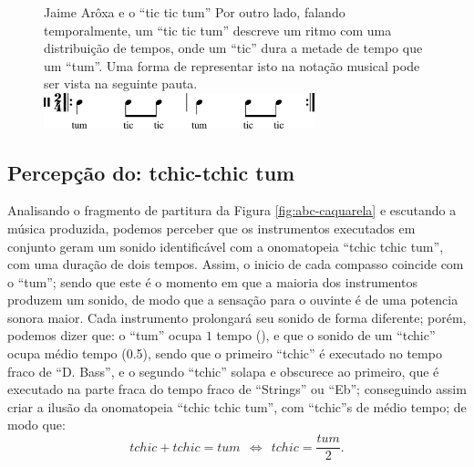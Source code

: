 \begin{figure}[hb!]
\begin{elaboracion}{Jaime Arôxa e o ``tic tic tum''}
Por outro lado, falando temporalmente, um ``tic tic tum'' descreve um ritmo com uma distribuição de tempos, 
onde um ``tic'' dura a metade de tempo que um ``tum''. 
Uma forma de representar isto na notação musical pode ser vista na seguinte pauta.\\

\centering
\href{https://drive.google.com/file/d/1CZaAP5lPzVX7oTT5EMpIKN-XbOUYUt3Y/view?usp=sharing}{\includegraphics[width=0.7\textwidth]{chapters/cap-musicalidade-percepcion/abc-tictictumaroxa-1.eps}}

\end{elaboracion}
\end{figure}


\subsection{Percepção do: tchic-tchic tum}

Analisando o fragmento de partitura da Figura \ref{fig:abc-caquarela} e escutando a música produzida, 
podemos perceber que os instrumentos executados em conjunto geram um sonido identificável
com a onomatopeia ``tchic tchic tum'', com uma duração de dois tempos.
Assim, o inicio de cada compasso coincide com o ``tum''; 
sendo que este é o momento em que a maioria dos instrumentos produzem um sonido, 
de modo que a sensação para o ouvinte é de uma potencia sonora maior. 
Cada instrumento prolongará seu sonido de forma diferente; 
porém,  podemos dizer que: o ``tum'' ocupa $1$ tempo (\quarternote), 
e que o sonido de um ``tchic'' ocupa médio tempo (0.5\quarternote),
sendo que o primeiro ``tchic'' é executado no tempo fraco de ``D. Bass'', 
e o segundo ``tchic'' solapa e obscurece ao  primeiro, 
que é executado na parte fraca do tempo fraco de ``Strings'' ou ``Eb'';
conseguindo assim criar a ilusão da onomatopeia ``tchic tchic tum'', 
com ``tchic''s de médio tempo; de modo que:
\begin{equation}
tchic + tchic = tum ~~ \Longleftrightarrow ~~ tchic = \frac{tum}{2}.
\end{equation}
 
